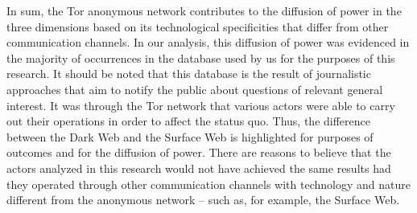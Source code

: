 In sum, the Tor anonymous network contributes to the diffusion of power in the three dimensions based on its technological specificities that differ from other communication channels. In our analysis, this diffusion of power was evidenced in the majority of occurrences in the database used by us for the purposes of this research. It should be noted that this database is the result of journalistic approaches that aim to notify the public about questions of relevant general interest. It was through the Tor network that various actors were able to carry out their operations in order to affect the status quo. Thus, the difference between the Dark Web and the Surface Web is highlighted for purposes of outcomes and for the diffusion of power. There are reasons to believe that the actors analyzed in this research would not have achieved the same results had they operated through other communication channels with technology and nature different from the anonymous network -- such as, for example, the Surface Web.

